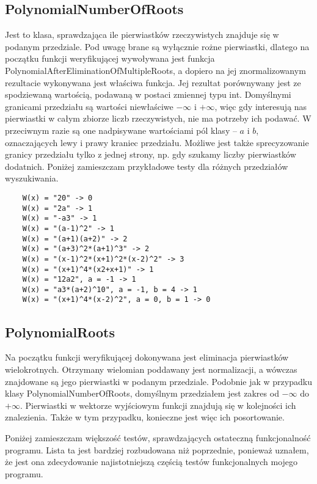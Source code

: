 \documentclass[oneside,a4paper]{book}
\begin{document}
	\subsection{PolynomialNumberOfRoots}
	
	Jest to klasa, sprawdzająca ile pierwiastków rzeczywistych znajduje się w podanym przedziale. Pod uwagę brane są wyłącznie rożne pierwiastki, dlatego na początku funkcji weryfikującej wywoływana jest funkcja PolynomialAfterEliminationOfMultipleRoots, a dopiero na jej znormalizowanym rezultacie wykonywana jest właściwa funkcja. Jej rezultat porównywany jest ze spodziewaną wartością, podawaną w postaci zmiennej typu int. Domyślnymi granicami przedziału są wartości niewłaściwe $-\infty$ i $+\infty$, więc gdy interesują nas pierwiastki w całym zbiorze liczb rzeczywistych, nie ma potrzeby ich podawać. W przeciwnym razie są one nadpisywane wartościami pól klasy – $a$ i $b$, oznaczających lewy i prawy kraniec przedziału. Możliwe jest także sprecyzowanie granicy przedziału tylko z jednej strony, np. gdy szukamy liczby pierwiastków dodatnich. Poniżej zamieszczam przykładowe testy dla różnych przedziałów wyszukiwania.
	
	\begin{lstlisting}
	W(x) = "20" -> 0
	W(x) = "2a" -> 1
	W(x) = "-a3" -> 1
	W(x) = "(a-1)^2" -> 1
	W(x) = "(a+1)(a+2)" -> 2
	W(x) = "(a+3)^2*(a+1)^3" -> 2
	W(x) = "(x-1)^2*(x+1)^2*(x-2)^2" -> 3
	W(x) = "(x+1)^4*(x2+x+1)" -> 1
	W(x) = "12a2", a = -1 -> 1
	W(x) = "a3*(a+2)^10", a = -1, b = 4 -> 1
	W(x) = "(x+1)^4*(x-2)^2", a = 0, b = 1 -> 0
	\end{lstlisting}
	
	\subsection{PolynomialRoots}
	
	Na początku funkcji weryfikującej dokonywana jest eliminacja pierwiastków wielokrotnych. Otrzymany wielomian poddawany jest normalizacji, a wówczas znajdowane są jego pierwiastki w podanym przedziale. Podobnie jak w przypadku klasy PolynomialNumberOfRoots, domyślnym przedziałem jest zakres od $-\infty$ do $+\infty$. Pierwiastki w wektorze wyjściowym funkcji znajdują się w kolejności ich znalezienia. Także w tym przypadku, konieczne jest więc ich posortowanie.
	
	Poniżej zamieszczam większość testów, sprawdzających ostateczną funkcjonalność programu. Lista ta jest bardziej rozbudowana niż poprzednie, ponieważ uznałem, że jest ona zdecydowanie najistotniejszą częścią testów funkcjonalnych mojego programu.
	
\end{document}
